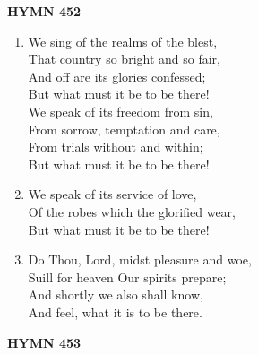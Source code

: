 \documentclass[11pt,a4paper]{article}
\begin{document}
\newpage
\begin{center}
    {\Large \textbf{HYMN 452}}
\end{center}
\vspace{1em}

\begin{enumerate}
    \item We sing of the realms of the blest, \\
        That country so bright and so fair, \\
        And off are its glories confessed; \\
        But what must it be to be there! \\
        We speak of its freedom from sin, \\
        From sorrow, temptation and care, \\
        From trials without and within; \\
        But what must it be to be there!

    \item We speak of its service of love, \\
        Of the robes which the glorified wear, \\
        But what must it be to be there!

    \item Do Thou, Lord, midst pleasure and woe, \\
        Suill for heaven Our spirits prepare; \\
        And shortly we also shall know, \\
        And feel, what it is to be there.

\end{enumerate}

\newpage
\begin{center}
    {\Large \textbf{HYMN 453}}
\end{center}
\vspace{1em}
\end{document}
